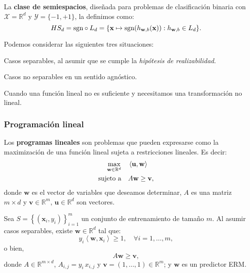 \documentclass[8pt,a4paper]{extarticle}
\begin{document}
\begin{multicols}{3}
\begin{boxdef}
	La \textbf{clase de semiespacios}, diseñada para problemas de clasificación binaria con $\mathcal{X} = \mathbb{R}^d$ y $\mathcal{Y} = \{-1, +1\} $, la definimos como:
	\[
		HS_d = \text{\normalfont sgn} \circ L_{d} = \{\mathbf{x} \mapsto \text{\normalfont sgn}(h_{\mathbf{w}, b} (\mathbf{x})) : h_{\mathbf{w}, b} \in L_d\} 
	.\] 
\end{boxdef}

Podemos considerar las siguientes tres situaciones:

\begin{numberlist}
\item Casos separables, al asumir que se cumple la \emph{hipótesis de realizabilidad}.
\item Casos no separables en un sentido agnóstico.
\item[\textcolor{dred}{3.}] Cuando una función lineal no es suficiente y necesitamos una transformación no lineal.
\end{numberlist}

\subsubsection{Programación lineal}

\begin{boxdef}
	Los \textbf{programas lineales} son problemas que pueden expresarse como la maximización de una función lineal sujeta a restricciones lineales. Es decir:
	\begin{align*}
		\max_{\mathbf{w} \in \mathbb{R}^d} \quad & \left<\mathbf{u}, \mathbf{w} \right> \\
		\text{\normalfont sujeto a} \quad & A\mathbf{w} \ge \mathbf{v}
	,\end{align*}
	donde $ \mathbf{w}$ es el vector de variables que deseamos determinar, $A$ es una matriz  $m \times d$ y $ \mathbf{v} \in \mathbb{R}^m$, $ \mathbf{u} \in \mathbb{R}^d$ son vectores.
\end{boxdef}

\begin{boxprop}[]
	Sea $\displaystyle S = \left\{ \left( \mathbf{x}_i, y_i \right)  \right\}_{i = 1}^m $ un conjunto de entrenamiento de tamaño $m$. Al asumir casos separables, existe  $ \mathbf{w} \in \mathbb{R}^d$ tal que:
	\[
	y_i \left< \mathbf{w}, \mathbf{x}_i \right> \ge 1, \quad \forall i = 1, \ldots, m
	,\]
	o bien,
	\[
	A\mathbf{w} \ge \mathbf{v}
	,\] 
	donde $A \in \mathbb{R}^{m \times d}$, $A_{i,j} = y_i\, x_{i,j}$ y $ \mathbf{v} = (1, \ldots, 1) \in \mathbb{R}^m$; y $ \mathbf{w}$ es un predictor ERM.
\end{boxprop}


\end{multicols}
\end{document}
